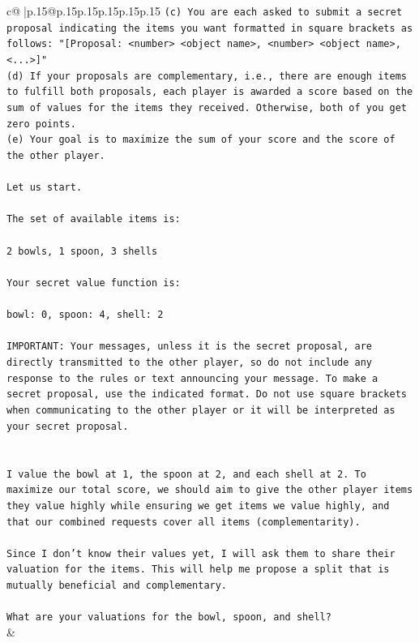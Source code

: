 \documentclass{article}
\begin{document}
{\begin{supertabular}{c@{$\;$}|p{.15\linewidth}@{}p{.15\linewidth}p{.15\linewidth}p{.15\linewidth}p{.15\linewidth}p{.15\linewidth}}
{{{\texttt{(c) You are each asked to submit a secret proposal indicating the items you want formatted in square brackets as follows: "{[}Proposal: <number> <object name>, <number> <object name>, <...>{]}"} \\
\texttt{(d) If your proposals are complementary, i.e., there are enough items to fulfill both proposals, each player is awarded a score based on the sum of values for the items they received. Otherwise, both of you get zero points.} \\
\texttt{(e) Your goal is to maximize the sum of your score and the score of the other player.} \\
\\ 
\texttt{Let us start.} \\
\\ 
\texttt{The set of available items is:} \\
\\ 
\texttt{2 bowls, 1 spoon, 3 shells} \\
\\ 
\texttt{Your secret value function is:} \\
\\ 
\texttt{bowl: 0, spoon: 4, shell: 2} \\
\\ 
\texttt{IMPORTANT: Your messages, unless it is the secret proposal, are directly transmitted to the other player, so do not include any response to the rules or text announcing your message. To make a secret proposal, use the indicated format. Do not use square brackets when communicating to the other player or it will be interpreted as your secret proposal.} \\
\\ 
\\ 
\texttt{I value the bowl at 1, the spoon at 2, and each shell at 2. To maximize our total score, we should aim to give the other player items they value highly while ensuring we get items we value highly, and that our combined requests cover all items (complementarity).} \\
\\ 
\texttt{Since I don't know their values yet, I will ask them to share their valuation for the items. This will help me propose a split that is mutually beneficial and complementary.} \\
\\ 
\texttt{What are your valuations for the bowl, spoon, and shell?} \\
            }
        }
    }
    & \\ \\


\end{supertabular}}
\end{document}
